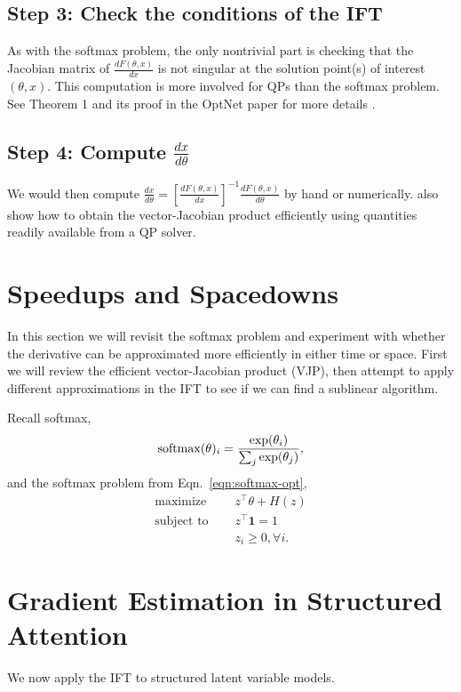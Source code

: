 \documentclass[11pt]{article}
\begin{document}
\subsection*{Step 3: Check the conditions of the IFT}
As with the softmax problem,
the only nontrivial part is checking that the Jacobian matrix of $\frac{dF(\theta,x)}{dx}$ is
not singular at the solution point(s) of interest $(\theta,x)$.
This computation is more involved for QPs than the softmax problem. 
See Theorem 1 and its proof in the OptNet paper for more details \citep{optnet}.

\subsection*{Step 4: Compute $\frac{dx}{d\theta}$}
We would then compute
$\frac{dx}{d\theta} = \left[\frac{dF(\theta,x)}{dx}\right]^{-1}\frac{dF(\theta,x)}{d\theta}$
by hand or numerically.
\citet{optnet} also show how to obtain the vector-Jacobian product efficiently
using quantities readily available from a QP solver.

\section{Speedups and Spacedowns}
In this section we will revisit the softmax problem and experiment with
whether the derivative can be approximated more efficiently in either time or space.
First we will review the efficient vector-Jacobian product (VJP),
then attempt to apply different approximations in the IFT to see if we can
find a sublinear algorithm.

Recall softmax,
$$\mathrm{softmax}(\theta)_i = \frac{\exp(\theta_i)}{\sum_j \exp(\theta_j)},$$
and the softmax problem from Eqn.~\ref{eqn:softmax-opt},
\begin{equation}
\begin{aligned}
\textrm{maximize } \quad & z^\top\theta + H(z)\\
\textrm{subject to } \quad & z^\top \mathbf{1} = 1\\
& z_i \geq 0, \forall i.
\end{aligned}
\end{equation}


\section{Gradient Estimation in Structured Attention}
We now apply the IFT to structured latent variable models.
\end{document}
